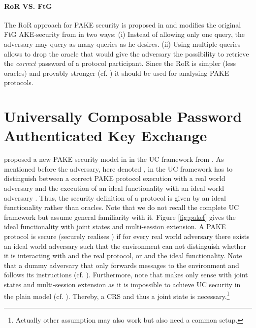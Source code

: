 \paragraph{RoR VS. FtG}
The \acl{RoR} approach for \ac{PAKE} security is proposed in \cite{Abdalla2005} and modifies the original \acl{FtG} \ac{AKE}-security from \cite{Bellare2000} in two ways:
(i) Instead of allowing only one \Test query, the adversary may query as many \Test queries as he desires.
(ii) Using multiple \Test queries allows to drop the \Reveal oracle that would give the adversary the possibility to retrieve the \emph{correct} password of a protocol participant.
Since the \ac{RoR} is simpler (less oracles) and provably stronger (cf. \cite[Lemma 2, Proposition 1]{Abdalla2005}) it should be used for analysing \ac{PAKE} protocols.

\section{Universally Composable Password Authenticated Key Exchange} \label{sec:ucpake}
\citeauthor{Canetti2005} proposed a new \ac{PAKE} security model in \cite{Canetti2005} in the \acl{UC} framework from \cite{Canetti2001a}.
As mentioned before the adversary, here denoted \cZ, in the \ac{UC} framework has to distinguish between a correct \ac{PAKE} protocol execution with a real world adversary \cA and the execution of an ideal functionality \cF with an ideal world adversary \cS.
Thus, the security definition of a protocol is given by an ideal functionality rather than oracles.
Note that we do not recall the complete \ac{UC} framework but assume general familiarity with it.
Figure \ref{fig:pakef} gives the ideal functionality \cFPAKE with joint states and multi-session extension.
A \ac{PAKE} protocol is secure (securely realises \cFPAKE) if for every real world adversary \cA there exists an ideal world adversary \cS such that the environment \cZ can not distinguish whether it is interacting with \cA and the real protocol, or \cS and the ideal functionality.
Note that a dummy adversary \cA that only forwards messages to the environment and follows its instructions (cf. \cite{Canetti2001a}).
Furthermore, note that \cFPAKE makes only sense with joint states and multi-session extension as it is impossible to achieve \ac{UC} security in the plain model (cf. \cite[Section 4]{Canetti2005}).
Thereby, a \ac{CRS} and thus a joint state is necessary.\footnote{Actually other assumption may also work but also need a common setup.}

